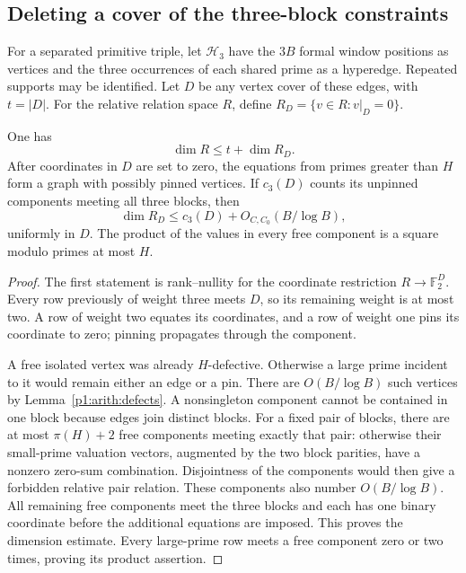 \subsection{Deleting a cover of the three-block constraints}

For a separated primitive triple, let $\mathcal H_3$ have the $3B$
formal window positions as vertices and the three occurrences of each
shared prime as a hyperedge. Repeated supports may be identified.
Let $D$ be any vertex cover of these edges, with $t=|D|$.
For the relative relation space $R$, define
$R_D=\{v\in R:v|_D=0\}$.

\begin{lemma}
\label{p1:offset:cover-rank}
One has
\[
 \dim R\le t+\dim R_D.
\]
After coordinates in $D$ are set to zero, the equations from primes
greater than $H$ form a graph with possibly pinned vertices. If $c_3(D)$
counts its unpinned components meeting all three blocks, then
\[
 \dim R_D\le c_3(D)+O_{C,C_0}(B/\log B),
\]
uniformly in $D$. The product of the values in every free component
is a square modulo primes at most $H$.
\end{lemma}
\begin{proof}
The first statement is rank--nullity for the coordinate restriction
$R\to\mathbb F_2^D$. Every row previously of weight three meets
$D$, so its remaining weight is at most two. A row of weight two
equates its coordinates, and a row of weight one pins its coordinate
to zero; pinning propagates through the component.

A free isolated vertex was already $H$-defective. Otherwise a large
prime incident to it would remain either an edge or a pin. There are
$O(B/\log B)$ such vertices by Lemma~\ref{p1:arith:defects}.
A nonsingleton component cannot be contained in one block because
edges join distinct blocks. For a fixed pair of blocks, there are at
most $\pi(H)+2$ free components meeting exactly that pair: otherwise
their small-prime valuation vectors, augmented by the two block
parities, have a nonzero zero-sum combination. Disjointness of the
components would then give a forbidden relative pair relation.
These components also number $O(B/\log B)$.
All remaining free components meet the three blocks and each has
one binary coordinate before the additional equations are imposed.
This proves the dimension estimate. Every large-prime row meets a
free component zero or two times, proving its product assertion.
\end{proof}

